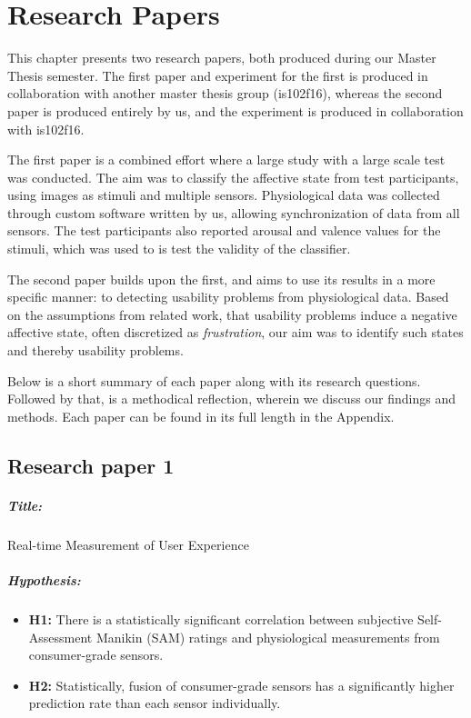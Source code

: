 \chapter{Research Papers}
This chapter presents two research papers, both produced during our Master
Thesis semester. The first paper and experiment for the first is produced in collaboration with another
master thesis group (is102f16), whereas the second paper is produced entirely by us, and the experiment is produced in collaboration with is102f16.

The first paper is a combined effort where a large study with a large scale test was conducted.
The aim was to classify the affective state from test participants, using images as stimuli and multiple sensors.
Physiological data was collected through custom software written by us, allowing synchronization of data from all sensors.
The test participants also reported arousal and valence values for the stimuli, which was used to is test the validity of the classifier.

The second paper builds upon the first, and aims to use its results in a more
specific manner: to detecting usability problems from physiological
data. Based on the assumptions from related work, that usability problems
induce a negative affective state, often discretized as \textit{frustration},
our aim was to identify such states and thereby usability problems.

Below is a short summary of each paper along with its research questions.
Followed by that, is a methodical reflection, wherein we discuss
our findings and methods. Each paper can be found in its full length in the
Appendix.

\section{Research paper 1}
\paragraph{Title:}
Real-time Measurement of User Experience
\paragraph{Hypothesis:}
\begin{itemize}
    \item \textbf{H1:} There is a statistically significant
      correlation between subjective Self-Assessment Manikin (SAM) ratings and physiological
      measurements from consumer-grade sensors.
    \item \textbf{H2:} Statistically, fusion of consumer-grade sensors
      has a significantly higher prediction rate than each sensor
      individually.
\end{itemize}
